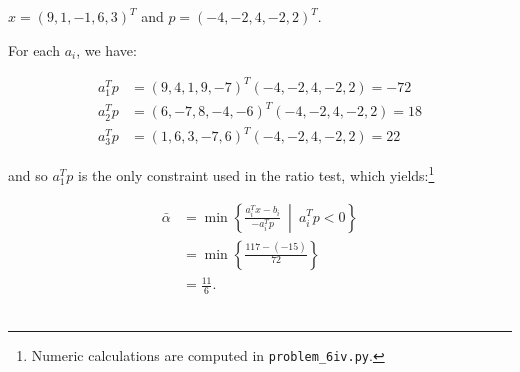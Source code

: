 $x = (9, 1, -1, 6, 3)^T$ and $p = (-4, -2, 4, -2, 2)^T.$

\begin{solution}
  For each $a_i$, we have:

  \begin{align*}
    a_1^T p &= (9, 4, 1, 9, -7)^T (-4, -2, 4, -2, 2) = -72 \\
    a_2^T p &= (6, -7, 8, -4, -6)^T (-4, -2, 4, -2, 2) = 18 \\
    a_3^T p &= (1, 6, 3, -7, 6)^T (-4, -2, 4, -2, 2) = 22
  \end{align*}

  and so $a_1^T p$ is the only constraint used in the ratio test, which yields:\footnote{
    Numeric calculations are computed in \texttt{problem\_6iv.py}.
  }

  \begin{align*}
    \bar{\alpha} &= \min \left\{ \frac{a_i^T x - b_i}{-a_i^Tp} \ \middle| \ a_i^T p < 0 \right\} \\
                 &= \min \left\{ \frac{117 - (-15)}{72} \right\} \\
                 &= \frac{11}{6}.
  \end{align*}
  \ \\
\end{solution}